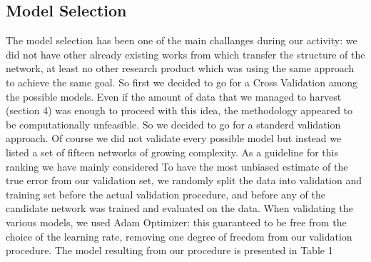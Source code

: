 \subsection{Model Selection}
The model selection has been one of the main challanges during our activity: we did not have other already existing works from which transfer the structure of the network, at least no other research product which was using the same approach to achieve the same goal. So first we decided to go for a Cross Validation among the possible models. Even if the amount of data that we managed to harvest (section 4) was enough to proceed with this idea, the methodology appeared to be computationally unfeasible. So we decided to go for a standerd validation approach. Of course we did not validate every possible model but instead we listed a set of fifteen networks of growing complexity. As a guideline for this ranking we have mainly considered 
To have the most unbiased estimate of the true error from our validation set, we randomly split the data into validation and training set before the actual validation procedure, and before any of the candidate network was trained and evaluated on the data.
When validating the various models, we used Adam Optimizer: this guaranteed to be free from the choice of the learning rate, removing one degree of freedom from our validation procedure.
The model resulting from our procedure is presented in Table 1
\\
